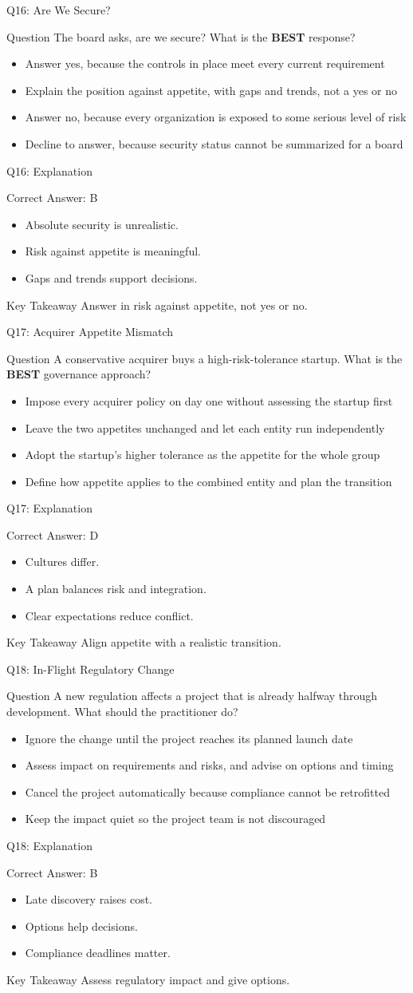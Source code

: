 \documentclass[aspectratio=169]{beamer}
\newcommand{\hq}[7]{%
	\begin{frame}{Q#1: #2}
		\begin{block}{Question}
			#3
		\end{block}
		\begin{itemize}
			#4
		\end{itemize}
	\end{frame}
	\begin{frame}{Q#1: Explanation}
		\begin{block}{Correct Answer: #5}
			\begin{itemize}
				#6
			\end{itemize}
		\end{block}
		\begin{alertblock}{Key Takeaway}
			#7
		\end{alertblock}
	\end{frame}
}
\begin{document}
	\hq{16}{Are We Secure?}
	{The board asks, are we secure? What is the \textbf{BEST} response?}
	{\item[\textbf{(A)}] Answer yes, because the controls in place meet every current requirement
		\item[\textbf{(B)}] Explain the position against appetite, with gaps and trends, not a yes or no
		\item[\textbf{(C)}] Answer no, because every organization is exposed to some serious level of risk
		\item[\textbf{(D)}] Decline to answer, because security status cannot be summarized for a board}
	{B}
	{\item Absolute security is unrealistic.
		\item Risk against appetite is meaningful.
		\item Gaps and trends support decisions.}
	{Answer in risk against appetite, not yes or no.}

	\hq{17}{Acquirer Appetite Mismatch}
	{A conservative acquirer buys a high-risk-tolerance startup. What is the \textbf{BEST} governance approach?}
	{\item[\textbf{(A)}] Impose every acquirer policy on day one without assessing the startup first
		\item[\textbf{(B)}] Leave the two appetites unchanged and let each entity run independently
		\item[\textbf{(C)}] Adopt the startup's higher tolerance as the appetite for the whole group
		\item[\textbf{(D)}] Define how appetite applies to the combined entity and plan the transition}
	{D}
	{\item Cultures differ.
		\item A plan balances risk and integration.
		\item Clear expectations reduce conflict.}
	{Align appetite with a realistic transition.}

	\hq{18}{In-Flight Regulatory Change}
	{A new regulation affects a project that is already halfway through development. What should the practitioner do?}
	{\item[\textbf{(A)}] Ignore the change until the project reaches its planned launch date
		\item[\textbf{(B)}] Assess impact on requirements and risks, and advise on options and timing
		\item[\textbf{(C)}] Cancel the project automatically because compliance cannot be retrofitted
		\item[\textbf{(D)}] Keep the impact quiet so the project team is not discouraged}
	{B}
	{\item Late discovery raises cost.
		\item Options help decisions.
		\item Compliance deadlines matter.}
	{Assess regulatory impact and give options.}
\end{document}
